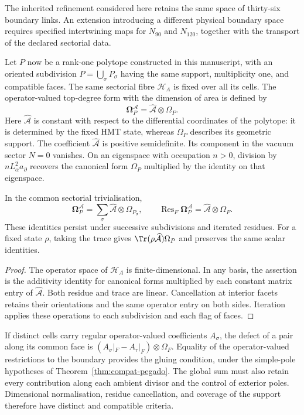 The inherited refinement considered here retains the same space
of thirty-six boundary links. An extension introducing a different
physical boundary space requires specified intertwining maps for
\(N_{90}\) and \(N_{120}\), together with the transport of the
declared sectorial data.

Let \(P\) now be a rank-one polytope constructed in this manuscript,
with an oriented subdivision \(P=\bigcup_\sigma P_\sigma\)
having the same support, multiplicity one, and compatible faces.
The same sectorial fibre \(\mathscr H_A\) is fixed over all
its cells. The operator-valued top-degree form with the
dimension of area is defined by
\[
 \boldsymbol\Omega^{\mathcal A}_P
 =\widehat{\mathcal A}\otimes\Omega_P.
\]
Here \(\widehat{\mathcal A}\) is constant with respect to the
differential coordinates of the polytope: it is determined by the
fixed HMT state, whereas \(\Omega_P\) describes its geometric support.
The coefficient \(\widehat{\mathcal A}\) is positive semidefinite.
Its component in the vacuum sector \(N=0\) vanishes. On an
eigenspace with occupation \(n>0\), division by
\(nL_\alpha^2a_\partial\) recovers the canonical form
\(\Omega_P\) multiplied by the identity on that eigenspace.

\begin{proposition}
\label{rev5:forma-areal}
In the common sectorial trivialisation,
\begin{equation}
 \boldsymbol\Omega^{\mathcal A}_P
 =\sum_\sigma\widehat{\mathcal A}\otimes\Omega_{P_\sigma},
 \qquad
 \operatorname{Res}_F\boldsymbol\Omega^{\mathcal A}_P
 =\widehat{\mathcal A}\otimes\Omega_F.
\end{equation}
These identities persist under successive subdivisions and
iterated residues. For a fixed state \(\rho\), taking the trace
gives \(\Tr(\rho\widehat{\mathcal A})\Omega_P\) and preserves
the same scalar identities.
\end{proposition}
\begin{proof}
The operator space of \(\mathscr H_A\) is finite-dimensional.
In any basis, the assertion is the additivity identity for
canonical forms multiplied by each constant matrix entry of
\(\widehat{\mathcal A}\). Both residue and trace are linear.
Cancellation at interior facets retains their orientations and
the same operator entry on both sides. Iteration applies these
operations to each subdivision and each flag of faces.
\end{proof}

If distinct cells carry regular operator-valued coefficients
\(A_\sigma\), the defect of a pair along its common face is
\((A_\sigma|_F-A_\tau|_F)\otimes\Omega_F\).
Equality of the operator-valued restrictions to the boundary
provides the gluing condition, under the simple-pole hypotheses
of Theorem~\ref{thm:compat-pegado}. The global sum must also retain
every contribution along each ambient divisor and the control
of exterior poles. Dimensional normalisation, residue cancellation,
and coverage of the support therefore have distinct and
compatible criteria.

